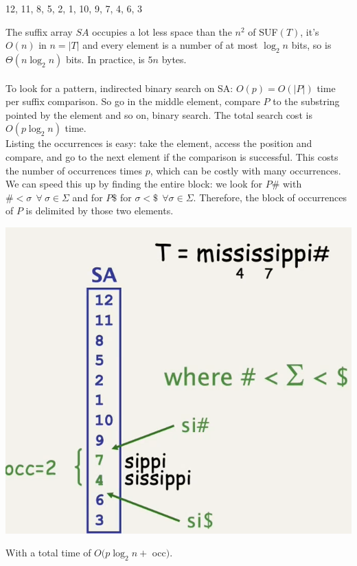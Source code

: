 \documentclass[10pt]{report}
\begin{document}
\begin{list}{}{}
	\item 12, 11, 8, 5, 2, 1, 10, 9, 7, 4, 6, 3
\end{list}
The suffix array $SA$ occupies a lot less space than the $n^2$ of SUF$(T)$, it's $O(n)$ in $n = |T|$ and every element is a number of at most $\log_2 n$ bits, so is $\Theta(n\log_2 n)$ bits. In practice, is $5n$ bytes.\\\\
To look for a pattern, indirected binary search on SA: $O(p) = O(|P|)$ time per suffix comparison. So go in the middle element, compare $P$ to the substring pointed by the element and so on, binary search. The total search cost is $O(p\log_2 n)$ time.\\
Listing the occurrences is easy: take the element, access the position and compare, and go to the next element if the comparison is successful. This costs the number of occurrences times $p$, which can be costly with many occurrences. We can speed this up by finding the entire block: we look for $P\#$ with $\#<\sigma\:\:\forall\:\sigma\in\Sigma$ and for $P\$$ for $\sigma < \$\:\:\forall\sigma\in\Sigma$. Therefore, the block of occurrences of $P$ is delimited by those two elements.
\begin{center}
	\includegraphics[scale=0.5]{20.png}
\end{center}
With a total time of $O(p\log_2 n +$ occ$)$.
\end{document}
